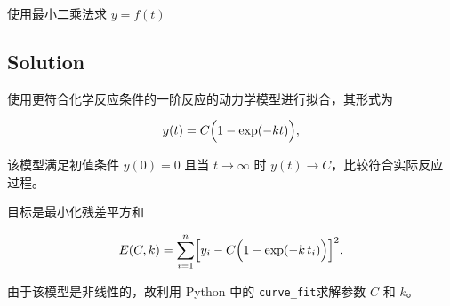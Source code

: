 \documentclass[11pt]{article}
\begin{document}
使用最小二乘法求 \(y = f(t)\)

\subsection{Solution}\label{solution}

使用更符合化学反应条件的一阶反应的动力学模型进行拟合，其形式为

\[
y(t)= C\Bigl(1-\exp(-kt)\Bigr),
\]

该模型满足初值条件 \(y(0)=0\) 且当 \(t\to\infty\) 时
\(y(t)\to C\)，比较符合实际反应过程。

目标是最小化残差平方和

\[
E(C,k)= \sum_{i=1}^{n}\Bigl[y_i - C\Bigl(1-\exp(-k\,t_i)\Bigr)\Bigr]^2.
\]

由于该模型是非线性的，故利用 Python 中的 \texttt{curve\_fit}求解参数
\(C\) 和 \(k\)。
\end{document}
